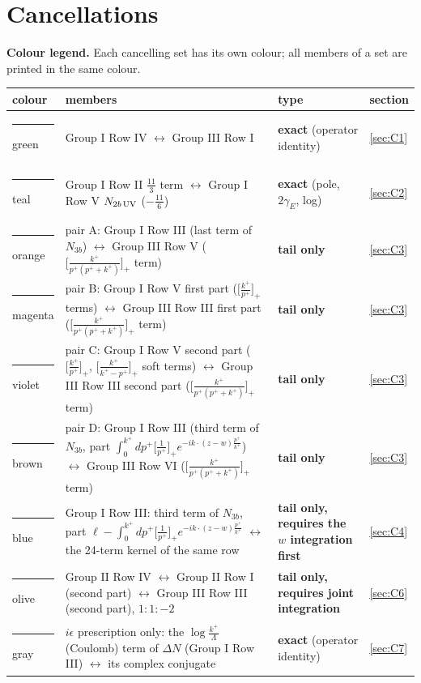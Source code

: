 \section{Cancellations}\label{sec:C}
\noindent\textbf{Colour legend.} Each cancelling set has its own colour; all members of a set are printed in the same colour.
\begin{center}
\renewcommand{\arraystretch}{1.25}\small
\begin{tabular}{|l|p{8.3cm}|p{5.2cm}|l|}\hline
colour & members & type & section\\\hline
{\color{cI4}\rule{2em}{1ex} green} & Group I Row IV $\leftrightarrow$ Group III Row I & \textbf{exact} (operator identity) & \ref{sec:C1}\\
{\color{cUV}\rule{2em}{1ex} teal} & Group I Row II $\frac{11}{3}$ term $\leftrightarrow$ Group I Row V $N_{2b\,\rm UV}$ ($-\frac{11}{6}$) & \textbf{exact} (pole, $2\gamma_{E}$, log) & \ref{sec:C2}\\
{\color{pA}\rule{2em}{1ex} orange} & pair A: Group I Row III (last term of $N_{3b}$) $\leftrightarrow$ Group III Row V ($\big[\frac{k^{+}}{p^{+}(p^{+}+k^{+})}\big]_{+}$ term) & \textbf{tail only} & \ref{sec:C3}\\
{\color{pB}\rule{2em}{1ex} magenta} & pair B: Group I Row V first part ($\big[\frac{k^{+}}{p^{+}}\big]_{+}$ terms) $\leftrightarrow$ Group III Row III first part ($\big[\frac{k^{+}}{p^{+}(p^{+}+k^{+})}\big]_{+}$ term) & \textbf{tail only} & \ref{sec:C3}\\
{\color{pC}\rule{2em}{1ex} violet} & pair C: Group I Row V second part ($\big[\frac{k^{+}}{p^{+}}\big]_{+}$, $\big[\frac{k^{+}}{k^{+}-p^{+}}\big]_{+}$ soft terms) $\leftrightarrow$ Group III Row III second part ($\big[\frac{k^{+}}{p^{+}(p^{+}+k^{+})}\big]_{+}$ term) & \textbf{tail only} & \ref{sec:C3}\\
{\color{pD}\rule{2em}{1ex} brown} & pair D: Group I Row III (third term of $N_{3b}$, part $\int_{0}^{k^{+}}dp^{+}\big[\frac{1}{p^{+}}\big]_{+}e^{-ik\cdot(z-w)\frac{p^{+}}{k^{+}}}$) $\leftrightarrow$ Group III Row VI ($\big[\frac{k^{+}}{p^{+}(p^{+}+k^{+})}\big]_{+}$ term) & \textbf{tail only} & \ref{sec:C3}\\
{\color{cPr}\rule{2em}{1ex} blue} & Group I Row III: third term of $N_{3b}$, part $\ell-\int_{0}^{k^{+}}dp^{+}\big[\frac{1}{p^{+}}\big]_{+}e^{-ik\cdot(z-w)\frac{p^{+}}{k^{+}}}$ $\leftrightarrow$ the 24-term kernel of the same row & \textbf{tail only, requires the $w$ integration first} & \ref{sec:C4}\\
{\color{cJt}\rule{2em}{1ex} olive} & Group II Row IV $\leftrightarrow$ Group II Row I (second part) $\leftrightarrow$ Group III Row III (second part), $1:1:-2$ & \textbf{tail only, requires joint integration} & \ref{sec:C6}\\
{\color{gray}\rule{2em}{1ex} gray} & $i\epsilon$ prescription only: the $\log\frac{k^{+}}{\Lambda}$ (Coulomb) term of $\Delta N$ (Group I Row III) $\leftrightarrow$ its complex conjugate & \textbf{exact} (operator identity) & \ref{sec:C7}\\\hline
\end{tabular}
\end{center}
